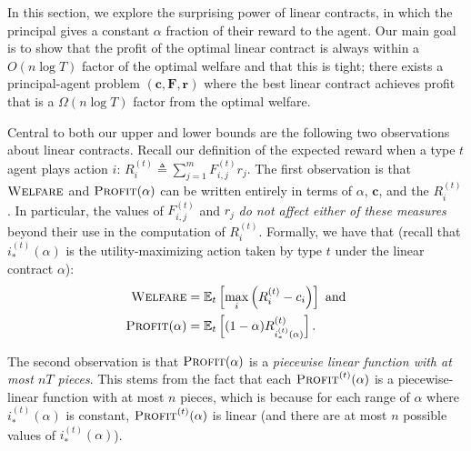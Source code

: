 \documentclass{article}
\newcommand{\jonnote}[1]{}
\newcommand{\E}{\mathbb{E}}
\def \Rev  {{\sf Rev}}
\def \Welf  {{\sf Welf}}
\newcommand{\costvector}{\bm{c}}
\newcommand{\Cost}[1]{c_{#1}}
\newcommand{\CostVector}{\bm{c}}
\newcommand{\TypedForecast}[3]{F^{(#1)}_{#2, #3}}
\newcommand{\ForecastTensor}{\bm{F}}
\newcommand{\rewardvector}{\bm{r}}
\newcommand{\Reward}[1]{r_{#1}}
\newcommand{\TypedExpectedReward}[2]{R^{(#1)}_{#2}}
\newcommand{\PrincipalAgentProblem}{\left(\costvector, \ForecastTensor, \rewardvector\right)}
\newcommand{\TransferCoefficient}{\alpha}
\newcommand{\OptimalAction}{i_*}
\newcommand{\TypedOptimalAction}[1]{\OptimalAction^{(#1)}}
\newcommand{\Profit}{\textsc{Profit}}
\newcommand{\TypedProfit}[1]{\Profit^{(#1)}}
\newcommand{\OWelfare}{\textsc{Welfare}}
\begin{document}


In this section, we explore the surprising power of linear contracts, in which the principal gives a constant $\TransferCoefficient$ fraction of their reward to the agent. Our main goal is to show that the profit of the optimal linear contract is always within a $O(n \log T)$ factor of the optimal welfare and that this is tight; there exists a principal-agent problem $\PrincipalAgentProblem$ where the best linear contract achieves profit that is a $\Omega(n \log T)$ factor from the optimal welfare.

Central to both our upper and lower bounds are the following two observations about linear contracts. Recall our definition of the expected reward when a type $t$ agent plays action $i$: $\TypedExpectedReward{t}{i} \triangleq \sum_{j=1}^m \TypedForecast{t}{i}{j} \Reward{j}$. The first observation is that $\OWelfare$ and $\Profit(\TransferCoefficient)$ can be written entirely in terms of $\TransferCoefficient$, $\CostVector$, and the $\TypedExpectedReward{t}{i}$. In particular, the values of $\TypedForecast{t}{i}{j}$ and $\Reward{j}$ \emph{do not affect either of these measures} beyond their use in the computation of $\TypedExpectedReward{t}{i}$. Formally, we have that (recall that $\TypedOptimalAction{t}(\TransferCoefficient)$ is the utility-maximizing action taken by type $t$ under the linear contract $\alpha$):
\begin{align*}
  \OWelfare                     &= \E_t \left[ \max_i \left(\TypedExpectedReward{t}{i} - \Cost{i} \right) \right] \text{ and} \\
  \Profit(\TransferCoefficient) &= \E_t \left[ (1-\TransferCoefficient) \TypedExpectedReward{t}{\TypedOptimalAction{t}(\TransferCoefficient)} \right] \text{.}
\end{align*}

The second observation is that $\Profit(\TransferCoefficient)$ is a \emph{piecewise linear function with at most $nT$ pieces}. This stems from the fact that each $\TypedProfit{t}(\TransferCoefficient)$ is a piecewise-linear function with at most $n$ pieces, which is because for each range of $\alpha$ where $\TypedOptimalAction{t}(\TransferCoefficient)$ is constant, $\TypedProfit{t}(\TransferCoefficient)$ is linear (and there are at most $n$ possible values of $\TypedOptimalAction{t}(\TransferCoefficient)$). 
\end{document}
